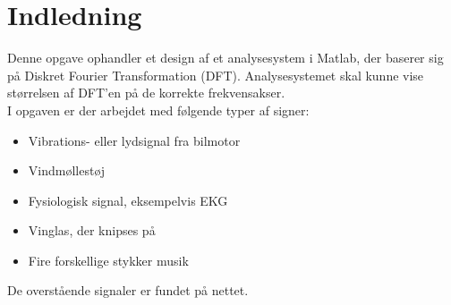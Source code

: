 \chapter{Indledning}\label{ch:introduction}
Denne opgave ophandler et design af et analysesystem i Matlab, der baserer sig på Diskret Fourier Transformation (DFT). 
Analysesystemet skal kunne vise størrelsen af DFT'en på de korrekte frekvensakser.
\\I opgaven er der arbejdet med følgende typer af signer:

\begin{itemize}
	\item Vibrations- eller lydsignal fra bilmotor
	\item Vindmøllestøj
	\item Fysiologisk signal, eksempelvis EKG
	\item Vinglas, der knipses på
	\item Fire forskellige stykker musik	
\end{itemize}

De overstående signaler er fundet på nettet.